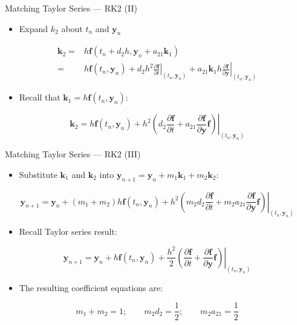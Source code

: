 \documentclass[serif]{beamer}
\begin{document}
\begin{frame}{Matching Taylor Series --- RK2 (II)}
  \begin{itemize}
  \item<1-> Expand $k_2$ about $t_n$ and $\mathbf{y}_n$
  \end{itemize}
  \begin{align*}
    \mathbf{k}_2 = &  h\mathbf{f}\left(t_n + d_2h, \mathbf{y}_n + a_{21}\mathbf{k}_1\right) \\
              = &  h\mathbf{f}\left(t_n,\mathbf{y}_n\right) + d_2h^2\left.\frac{\partial\mathbf{f}}{\partial t}\right|_{\left(t_n,\mathbf{y}_n\right)} + a_{21}\mathbf{k}_1h\left.\frac{\partial\mathbf{f}}{\partial \mathbf{y}}\right|_{\left(t_n,\mathbf{y}_n\right)}
  \end{align*}
  \begin{itemize}
  \item<1-> Recall that $\mathbf{k}_1 = h\mathbf{f}\left(t_n,\mathbf{y}_n\right)$:
  \end{itemize}
  \begin{equation}
    \nonumber
    \mathbf{k}_2 =  h\mathbf{f}\left(t_n,\mathbf{y}_n\right) + h^2\left.\left(d_2\frac{\partial\mathbf{f}}{\partial t}+  a_{21}\frac{\partial\mathbf{f}}{\partial \mathbf{y}}\mathbf{f}\right)\right|_{\left(t_n,\mathbf{y}_n\right)}
  \end{equation}
\end{frame}

\begin{frame}{Matching Taylor Series --- RK2 (III)}
  \begin{itemize}
  \item<1-> Substitute $\mathbf{k}_1$ and $\mathbf{k}_2$ into $ \mathbf{y}_{n+1} = \mathbf{y}_n + m_1\mathbf{k}_1 + m_2\mathbf{k}_2$:
  \end{itemize}
  \begin{equation}
    \nonumber
    \mathbf{y}_{n+1} = \mathbf{y}_n + \left(m_1 + m_2\right)h\mathbf{f}\left(t_n,\mathbf{y}_n\right) + h^2\left.\left(m_2d_2\frac{\partial\mathbf{f}}{\partial t}+  m_2a_{21}\frac{\partial\mathbf{f}}{\partial \mathbf{y}}\mathbf{f}\right)\right|_{\left(t_n,\mathbf{y}_n\right)}
  \end{equation}
  \begin{itemize}
  \item<1-> Recall Taylor series result:
  \end{itemize}
  \begin{equation}
    \nonumber
    \mathbf{y}_{n+1} = \mathbf{y}_n + h\mathbf{f}\left(t_n,\mathbf{y}_n\right) + \frac{h^2}{2}\left.\left(\frac{\partial\mathbf{f}}{\partial t} +  \frac{\partial\mathbf{f}}{\partial \mathbf{y}} \mathbf{f}\right)\right|_{\left(t_n,\mathbf{y}_n\right)}
  \end{equation}
  \begin{itemize}
    \item<1-> The resulting coefficient equations are:
  \end{itemize}
  \begin{equation}
  \nonumber\boxed{
  m_1 + m_2 = 1; \qquad m_2d_2 = \frac{1}{2}; \qquad m_2a_{21} = \frac{1}{2}}
  \end{equation}
\end{frame}
\end{document}
